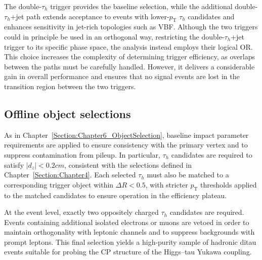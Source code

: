 The double-$\tau_h$ trigger provides the baseline selection, while the additional double-$\tau_h$+jet path extends acceptance to events with lower-$p_\text{T}$ $\tau_h$ candidates and enhances sensitivity in jet-rich topologies such as \ac{VBF}. Although the two triggers could in principle be used in an orthogonal way, restricting the double-$\tau_h$+jet trigger to its specific phase space, the analysis instead employs their logical OR. This choice increases the complexity of determining trigger efficiency, as overlaps between the paths must be carefully handled. However, it delivers a considerable gain in overall performance and ensures that no signal events are lost in the transition region between the two triggers. 

\subsection{Offline object selections}

As in Chapter~\ref{Section:Chapter6_ObjectSelection}, baseline impact parameter requirements are applied to ensure consistency with the primary vertex and to suppress contamination from pileup. In particular, $\tau_h$ candidates are required to satisfy $|d_z| < 0.2\unit{cm}$, consistent with the selections defined in Chapter~\ref{Section:Chapter4}. Each selected $\tau_h$ must also be matched to a corresponding trigger object within $\Delta R < 0.5$, with stricter $p_\text{T}$ thresholds applied to the matched candidates to ensure operation in the efficiency plateau.

At the event level, exactly two oppositely charged $\tau_h$ candidates are required. Events containing additional isolated electrons or muons are vetoed in order to maintain orthogonality with leptonic channels and to suppress backgrounds with prompt leptons. This final selection yields a high-purity sample of hadronic ditau events suitable for probing the CP structure of the Higgs–tau Yukawa coupling.

